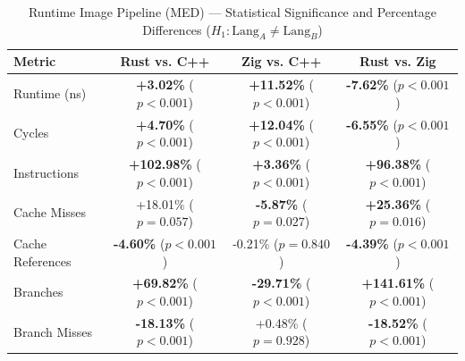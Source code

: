 \begin{table}[htbp]
\centering
\caption{Runtime Image Pipeline (MED) --- Statistical Significance and Percentage Differences ($H_1: \text{Lang}_A \neq \text{Lang}_B$)}
\label{tab:image_pipeline_runtime_MED_true_false_true}
\begin{tabular}{l ccc}
\toprule
\textbf{Metric} & \textbf{Rust vs. C++} & \textbf{Zig vs. C++} & \textbf{Rust vs. Zig} \\
\midrule
Runtime (ns) & \textbf{+3.02\%} ($p < 0.001$) & \textbf{+11.52\%} ($p < 0.001$) & \textbf{-7.62\%} ($p < 0.001$) \\
Cycles & \textbf{+4.70\%} ($p < 0.001$) & \textbf{+12.04\%} ($p < 0.001$) & \textbf{-6.55\%} ($p < 0.001$) \\
Instructions & \textbf{+102.98\%} ($p < 0.001$) & \textbf{+3.36\%} ($p < 0.001$) & \textbf{+96.38\%} ($p < 0.001$) \\
Cache Misses & +18.01\% ($p = 0.057$) & \textbf{-5.87\%} ($p = 0.027$) & \textbf{+25.36\%} ($p = 0.016$) \\
Cache References & \textbf{-4.60\%} ($p < 0.001$) & -0.21\% ($p = 0.840$) & \textbf{-4.39\%} ($p < 0.001$) \\
Branches & \textbf{+69.82\%} ($p < 0.001$) & \textbf{-29.71\%} ($p < 0.001$) & \textbf{+141.61\%} ($p < 0.001$) \\
Branch Misses & \textbf{-18.13\%} ($p < 0.001$) & +0.48\% ($p = 0.928$) & \textbf{-18.52\%} ($p < 0.001$) \\
\bottomrule
\end{tabular}
\end{table}


